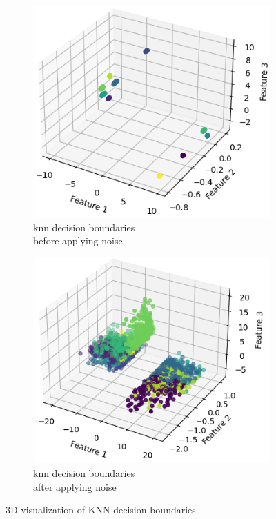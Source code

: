 \documentclass[11pt,
  oneside,openany,    %
]{scrreprt}
\begin{document}
\begin{figure}[h!]
  \centering
  \captionsetup{justification=centering}
  \begin{subfigure}[b]{0.49\textwidth}
    \centering
    \includegraphics[width=\textwidth]{figures/knn_before.png}
    \caption{knn decision boundaries\\before applying noise}
  \end{subfigure}
  \hfill
  \begin{subfigure}[b]{0.49\textwidth}
    \centering
    \includegraphics[width=\textwidth]{figures/knn_after.png}
    \caption{knn decision boundaries\\after applying noise}
  \end{subfigure}
  \caption{3D visualization of KNN decision boundaries.}
  \label{fig:knn_decision_boundaries}
\end{figure}
\end{document}
